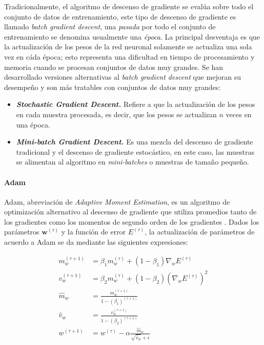             Tradicionalmente, el algoritmo de descenso de gradiente se evalúa sobre todo el conjunto de datos de entrenamiento, 
            este tipo de descenso de gradiente es llamado \textit{batch gradient descent}, una \textit{pasada} por todo el conjunto 
            de entrenamiento se denomina usualmente una \textit{época}. La principal desventaja es que la 
            actualización de los pesos de la red neuronal solamente se actualiza una sola vez en cáda época; esto representa una 
            dificultad en tiempo de procesamiento y memoria cuando se procesan conjuntos de datos muy grandes. Se han desarrollado 
            versiones alternativas al \textit{batch gradient descent} que mejoran su desempeño y son más tratables con 
            conjuntos de datos muy grandes:

            \begin{itemize}
                \item \textbf{\textit{Stochastic Gradient Descent.}} Refiere a que la actualización de los pesos en cada muestra procesada, es decir, que los pesos se actualizan $n$ veces en una época.
                \item \textbf{\textit{Mini-batch Gradient Descent.}} Es una mezcla del descenso de gradiente tradicional y el descenso de gradiente estocástico, en este caso, las muestras se alimentan al algoritmo en \textit{mini-batches} o muestras de tamaño pequeño.
            \end{itemize}
        
            \paragraph{Adam}\label{sec:adam}
            Adam, abreviación de \textit{Adaptive Moment Estimation}, es un algoritmo de optimización alternativo al descenso de 
            gradiente que utiliza promedios tanto de los gradientes como los momentos de segundo orden de los gradientes \cite{kingma2014adam}. Dados 
            los parámetros $\mathbf{w}^{(\tau)}$ y la función de error $E^{(\tau)}$, la actualización de parámetros de acuerdo 
            a Adam se da mediante las siguientes expresiones:

            \begin{align}
                m_w^{(\tau + 1)} &= \beta_1 m_w^{(\tau)} + (1 - \beta_1) \nabla_w E^{(\tau)} \nonumber \\
                v_w^{(\tau + 1)} &= \beta_2 m_w^{(\tau)} + (1 - \beta_2) (\nabla_w E^{(\tau)})^2 \nonumber \\
                \hat{m}_w &= \frac{m_w^{(\tau + 1)}}{1 - (\beta_1)^{(\tau + 1)} } \nonumber \\
                \hat{v}_w &= \frac{v_w^{(\tau + 1)}}{1 - (\beta_2)^{(\tau + 1)} } \nonumber \\
                w^{(\tau + 1)} &= w^{(\tau)} - \alpha \frac{\hat{m}_w}{\sqrt{\hat{v}_w} + \epsilon} \label{eq:adam}
            \end{align}

